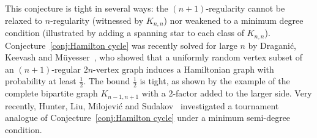 \documentclass[11pt, a4paper]{article}
\theoremstyle{definition}
\newcommand{\<}{\subseteq}
\begin{document}
{This conjecture is tight in several ways: the \((n+1)\)-regularity cannot be relaxed to \(n\)-regularity (witnessed by \(K_{n,n}\)) nor weakened to a minimum degree condition (illustrated by adding a spanning star to each class of \(K_{n,n}\)). %
Conjecture~\ref{conj:Hamilton cycle} was recently solved for large $n$ by Dragani\'c, Keevash and M\"uyesser~\cite{Keevash2025}, who showed that a uniformly random vertex subset of an $(n+1)$-regular $2n$-vertex graph induces a Hamiltonian graph with probability at least $\frac{1}{2}$. The bound  $\frac{1}{2}$ is tight, as shown by the example of the  complete bipartite graph $K_{n-1,n+1}$ with a $2$-factor added to the larger side.    %
Very recently, Hunter, Liu, Milojevi\'c and Sudakov~\cite{hunter2025}  investigated a tournament analogue of Conjecture~\ref{conj:Hamilton cycle} under a minimum semi-degree condition.} %
\end{document}
